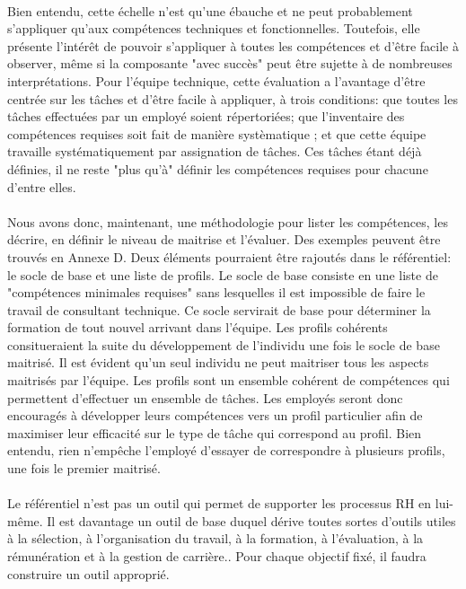 \paragraph{}Bien entendu, cette échelle n'est qu'une ébauche et ne peut probablement s'appliquer qu'aux compétences techniques et fonctionnelles. Toutefois, elle présente l'intérêt de pouvoir s'appliquer à toutes les compétences et d'être facile à observer, même si la composante "avec succès" peut être sujette à de nombreuses interprétations. Pour l'équipe technique, cette évaluation a l'avantage d'être centrée sur les tâches et d'être facile à appliquer, à trois conditions: que toutes les tâches effectuées par un employé soient répertoriées; que l'inventaire des compétences requises soit fait de manière systèmatique ; et que cette équipe travaille systématiquement par assignation de tâches. Ces tâches étant déjà définies, il ne reste "plus qu'à" définir les compétences requises pour chacune d'entre elles. 

\paragraph{} Nous avons donc, maintenant, une méthodologie pour lister les compétences, les décrire, en définir le niveau de maitrise et l'évaluer. Des exemples peuvent être trouvés en Annexe D. Deux éléments pourraient être rajoutés dans le référentiel: le socle de base et une liste de profils. Le socle de base consiste en une liste de "compétences minimales requises" sans lesquelles il est impossible de faire le travail de consultant technique. Ce socle servirait de base pour déterminer la formation de tout nouvel arrivant dans l'équipe. Les profils cohérents consitueraient la suite du développement de l'individu une fois le socle de base maitrisé. Il est évident qu'un seul individu ne peut maitriser tous les aspects maitrisés par l'équipe. Les profils sont un ensemble cohérent de compétences qui permettent d'effectuer un ensemble de tâches. Les employés seront donc encouragés à développer leurs compétences vers un profil particulier afin de maximiser leur efficacité sur le type de tâche qui correspond au profil. Bien entendu, rien n'empêche l'employé d'essayer de correspondre à plusieurs profils, une fois le premier maitrisé.  


\paragraph{}Le référentiel n'est pas un outil qui permet de supporter les processus RH en lui-même. Il est davantage un outil de base duquel dérive toutes sortes d'outils utiles à la sélection, à l'organisation du travail, à la formation, à l'évaluation, à la rémunération et à la gestion de carrière.\citep[pp.29]{refcompetence}. Pour chaque objectif fixé, il faudra construire un outil approprié. 

